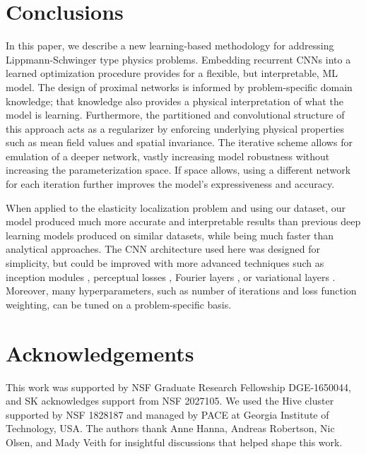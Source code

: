 \documentclass[3p, preprint]{elsarticle}
\newenvironment{revision} {} {}
\begin{document}
\FloatBarrier

\section{Conclusions}\label{sec:conclusions}
In this paper, we describe a new learning-based methodology for addressing Lippmann-Schwinger type physics problems. Embedding recurrent CNNs into a learned optimization procedure provides for a flexible, but interpretable, ML model. The design of proximal networks is informed by problem-specific domain knowledge; that knowledge also provides a physical interpretation of what the model is learning. Furthermore, the partitioned and convolutional structure of this approach acts as a regularizer by enforcing underlying physical properties such as mean field values and spatial invariance. The iterative scheme allows for emulation of a deeper network, vastly increasing model robustness without increasing the parameterization space. If space allows, using a different network for each iteration further improves the model's expressiveness and accuracy. 

When applied to the elasticity localization problem \begin{revision} and using our dataset, our model produced much more accurate and interpretable results than previous deep learning models produced on similar datasets\end{revision}, while being much faster than analytical approaches. The CNN architecture used here was designed for simplicity, but could be improved with more advanced techniques such as inception modules \cite{szegedy_2014inception}, perceptual losses \cite{johnson2016_perceptuallosses}, Fourier layers \cite{li2020fourier}, or variational layers \cite{shridhar2019}. Moreover, many hyperparameters, such as number of iterations and loss function weighting, can be tuned on a problem-specific basis.

\section{Acknowledgements}\label{sec:acks}

This work was supported by NSF Graduate Research Fellowship DGE-1650044, and SK acknowledges support from NSF 2027105. We used the Hive cluster supported by NSF 1828187 and managed by PACE at Georgia Institute of Technology, USA. The authors thank Anne Hanna, Andreas Robertson, Nic Olsen, and Mady Veith for insightful discussions that helped shape this work. 
\end{document}
